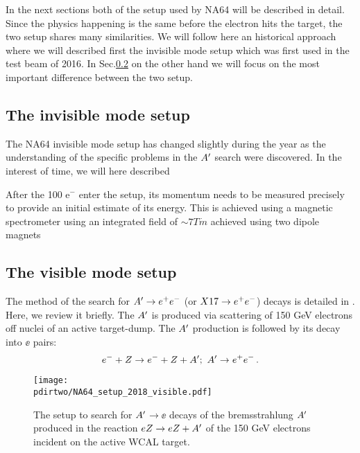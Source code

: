 In the next sections both of the setup used by NA64 will be described in detail. Since the physics happening is the same before the electron hits the target, the two setup shares many similarities. We will follow here an historical approach where we will described first the invisible mode setup which was first used in the test beam of 2016. In Sec.\ref{chapter2:sec:vismode} on the other hand we will focus on the most important difference between the two setup.

\subsection{The invisible mode setup}
\label{chapter2:sec:invismode}

The NA64 invisible mode setup has changed slightly during the year as the understanding of the specific problems in the $A'$ search were discovered. In the interest of time, we will here described 

After the 100 \gev e$^-$ enter the setup, its momentum needs to be measured precisely to provide an initial estimate of its energy. This is achieved using a magnetic spectrometer using an integrated field of $\sim 7 T \dot m$ achieved using two dipole magnets \cite{mbpl}

\subsection{The visible mode setup}
\label{chapter2:sec:vismode}

The method of the search for $A' \to e^+e^-$ (or $X17 \rightarrow e^+ e^-$) decays is detailed in \cite{Gninenko:2013rka, Andreas:2013lya, gkkk1, DMsimulation}. Here, we review it briefly. The $A'$ is produced via scattering of 150 GeV electrons off nuclei of an active target-dump. The $A'$ production is followed by its decay into $\ee$ pairs:
\begin{equation}
e^- + Z \to e^- + Z + A'   ;~ A'\to e^+e^- \,.
\label{ea}
\end{equation}


\begin{figure}[tb]
\centering
\texttt{[image: \\pdirtwo/NA64\_setup\_2018\_visible.pdf]}
\caption[NA64 visible mode setup 2018]{The setup to search for $A'$$\to \ee$  decays of the bremsstrahlung $A'$ produced in the reaction
$eZ \to eZ+A' $ of the 150 GeV electrons incident on the active WCAL target.}
\label{fig:setup-2018}
\end{figure}

